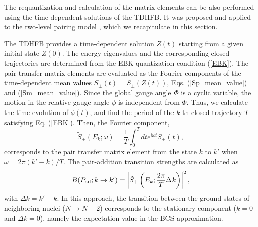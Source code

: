 \documentclass[%
superscriptaddress,
preprint,
showpacs,
nofootinbib,
amsmath,amssymb,
prc,
floatfix ]%
{revtex4-1}
\begin{document}
The requantization and calculation of the matrix elements can be also
performed using the time-dependent solutions of the TDHFB.
It was proposed and applied to the two-level pairing model \cite{CDS84},
which we recapitulate in this section.

The TDHFB provides a time-dependent solution $Z(t)$ starting from
a given initial state $Z(0)$.
The energy eigenvalues and the corresponding closed trajectories
are determined from the EBK quantization condition (\ref{EBK}).
The pair transfer matrix elements are evaluated as the Fourier components
of the time-dependent mean values $S_\pm(t)=S_\pm(Z(t))$,
Eqs. (\ref{Sp_mean_value}) and (\ref{Sm_mean_value}).
Since the global gauge angle $\Phi$ is a cyclic variable,
the motion in the relative gauge angle $\phi$ is independent from $\Phi$.
Thus, we calculate the time evolution of $\phi(t)$, and
find the period of the $k$-th closed trajectory $T$
satisfying Eq. (\ref{EBK}).
Then, the Fourier component,
\begin{equation}
	\tilde{S}_\pm(E_k; \omega) = \frac{1}{T}\int_0^T dt
	e^{i\omega t} S_\pm(t) ,
\label{Fourier_decomposition}
\end{equation}
corresponds to the pair transfer matrix element from the state $k$ to $k'$
when $\omega=2\pi (k'-k)/T$.
The pair-addition transition strengths are calculated as
\begin{equation}
	B(P_{\rm ad};k\rightarrow k') 
	= \left|\tilde{S}_+\left(E_k;\frac{2\pi}{T}\Delta k \right) \right|^2 ,
\end{equation}
with $\Delta k=k'-k$.
In this approach, the transition between the ground states of
neighboring nuclei ($N\rightarrow N+2$) corresponds to
the stationary component ($k=0$ and $\Delta k=0$),
namely the expectation value in the BCS approximation.
\end{document}
